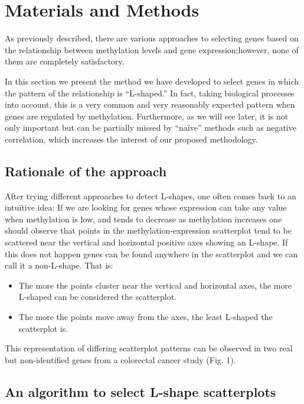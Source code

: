 \documentclass[10pt,letterpaper]{article}
\providecommand{\tightlist}{%
  \setlength{\itemsep}{0pt}\setlength{\parskip}{0pt}}
\begin{document}
\hypertarget{materials-and-methods}{%
\section{Materials and Methods}\label{materials-and-methods}}

As previously described, there are various approaches to selecting genes
based on the relationship between methylation levels and gene
expression;however, none of them are completely satisfactory.

In this section we present the method we have developed to select genes
in which the pattern of the relationship is ``L-shaped.'' In fact,
taking biological processes into account, this is a very common and very
reasonably expected pattern when genes are regulated by methylation.
Furthermore, as we will see later, it is not only important but can be
partially missed by ``naïve'' methods such as negative correlation,
which increases the interest of our proposed methodology.

\hypertarget{rationale-of-the-approach}{%
\subsection{Rationale of the approach}\label{rationale-of-the-approach}}

After trying different approaches to detect L-shapes, one often comes
back to an intuïtive idea: If we are looking for genes whose expression
can take any value when methylation is low, and tends to decrease as
methylation increases one should observe that points in the
methylation-expression scatterplot tend to be scattered near the
vertical and horizontal positive axes showing an L-shape. If this does
not happen genes can be found anywhere in the scatterplot and we can
call it a non-L-shape. That is:

\begin{itemize}
\tightlist
\item
  The more the points cluster near the vertical and horizontal axes, the
  more L-shaped can be considered the scatterplot.
\item
  The more the points move away from the axes, the least L-shaped the
  scatterplot is.
\end{itemize}

This representation of differing scatterplot patterns can be observed in
two real but non-identified genes from a colorectal cancer study (Fig.
1).

\hypertarget{an-algorithm-to-select-l-shape-scatterplots}{%
\subsection{An algorithm to select L-shape
scatterplots}\label{an-algorithm-to-select-l-shape-scatterplots}}
\end{document}
